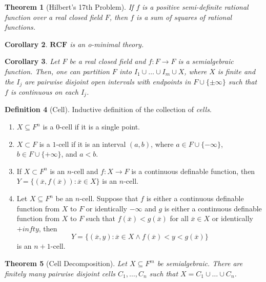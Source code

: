 \documentclass{amsart}
\newtheorem{theorem}{Theorem}[section]
\newtheorem{corollary}[theorem]{Corollary}
\theoremstyle{definition}
\newtheorem{definition}[theorem]{Definition}
\numberwithin{equation}{section}
\begin{document}
\begin{theorem}[Hilbert's 17th Problem]
    If $f$ is a positive semi-definite rational function over a real closed field $F$,
    then $f$ is a sum of squares of rational functions.
\end{theorem}

\begin{corollary}
    $\mathbf{RCF}$ is an o-minimal theory.
\end{corollary}

\begin{corollary}
    Let $F$ be a real closed field and $f: F \to F$ is a semialgebraic function.
    Then, one can partition $F$ into $I_1\cup \dots \cup I_m\cup X$,
    where $X$ is finite and the $I_j$ are pairwise disjoint open intervals with endpoints in $F\cup \{\pm\infty\}$ such that $f$ is continuous on each $I_j$.
\end{corollary}

\begin{definition}[Cell]
    Inductive definition of the collection of \emph{cells}.
    \begin{enumerate}[label = {$\bullet$}]
        \item $X \subseteq F^n$ is a $0$-cell if it is a single point.
        \item $X \subset F$ is a $1$-cell if it is an interval $(a,b)$, where $a \in F \cup \{-\infty\}$, $b\in F\cup \{+\infty\}$, and $a < b$.
        \item If $X \subset F^n$ is an $n$-cell and $f: X\to F$ is a continuous definable function, then $Y = \{(\overline{x},f(\overline{x})): \overline{x} \in X\}$ is an $n$-cell.
        \item Let $X \subseteq F^n$ be an $n$-cell. Suppose that $f$ is either a continuous definable function from $X$ to $F$ or identically $-\infty$ and $g$ is either a continuous definable function from $X$ to $F$ such that $f(\overline{x}) < g(\overline{x})$ for all $\overline{x} \in X$ or identically $+infty$, then 
        \[
        Y = \{(\overline{x},y): \overline{x} \in X \land f(\overline{x}) < y < g(\overline{x})\}
        \]
        is an $n+1$-cell.
    \end{enumerate}
\end{definition}

\begin{theorem} [Cell Decomposition]
    Let $X \subseteq F^m$ be semialgebraic.
    There are finitely many pairwise disjoint cells $C_1,\dots,C_n$ such that $X = C_1 \cup \dots \cup C_n$.
\end{theorem}
\end{document}
